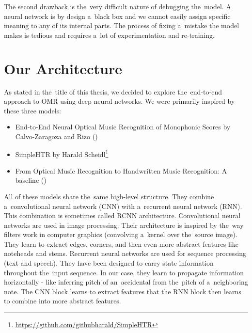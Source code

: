The second drawback is the~very difficult nature of debugging the~model. A neural network is by design a~black box and we cannot easily assign specific meaning to any of its internal parts. The process of fixing a~mistake the model makes is tedious and requires a~lot of experimentation and re-training.


\section{Our Architecture}

As stated in the~title of this thesis, we decided to explore the~end-to-end approach to OMR using deep neural networks. We were primarily inspired by these three models:

\begin{itemize}
\item End-to-End Neural Optical Music Recognition of Monophonic Scores by Calvo-Zaragoza and Rizo (\cite{Primus})
\item SimpleHTR by Harald Scheidl\footnote{\href{https://github.com/githubharald/SimpleHTR}{https://github.com/githubharald/SimpleHTR}}
\item From Optical Music Recognition to Handwritten Music Recognition: A baseline (\cite{HmrBaseline})
\end{itemize}

All of these models share the~same high-level structure. They combine a~convolutional neural network (CNN) with a~recurrent neural network (RNN). This combination is sometimes called RCNN architecture. Convolutional neural networks are used in image processing. Their architecture is inspired by the~way filters work in computer graphics (convolving a~kernel over the~source image). They learn to extract edges, corners, and then even more abstract features like noteheads and stems. Recurrent neural networks are used for sequence processing (text and speech). They have been designed to carry state information throughout the~input sequence. In our case, they learn to propagate information horizontally - like inferring pitch of an~accidental from the~pitch of a~neighboring note. The CNN block learns to extract features that the RNN block then learns to combine into more abstract features.

